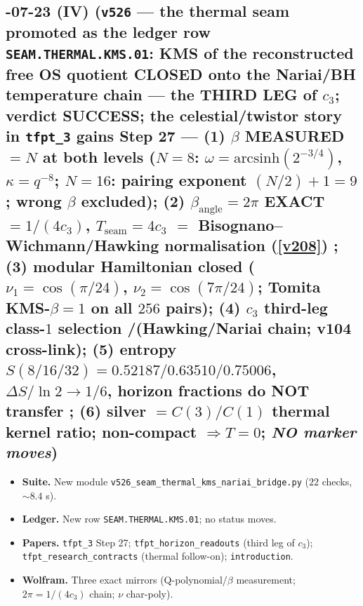 \subsection*{-07-23 (IV) (\texttt{v526} --- the thermal seam promoted as the ledger row \texttt{SEAM.THERMAL.KMS.01}: KMS of the reconstructed free OS quotient CLOSED onto the Nariai/BH temperature chain --- the THIRD LEG of $c_3$; verdict SUCCESS; the celestial/twistor story in \texttt{tfpt\_3} gains Step 27 --- (1) $\beta$ MEASURED $=N$ at both levels \mE ($N=8$: $\omega=\mathrm{arcsinh}(2^{-3/4})$, $\kappa=q^{-8}$; $N=16$: pairing exponent $(N/2)+1=9$; wrong $\beta$ excluded); (2) $\beta_{\mathrm{angle}}=2\pi$ EXACT $=1/(4c_3)$, $T_{\mathrm{seam}}=4c_3$ $=$ Bisognano--Wichmann/Hawking normalisation (\vref{v208}) \mE; (3) modular Hamiltonian closed \mE ($\nu_1=\cos(\pi/24)$, $\nu_2=\cos(7\pi/24)$; Tomita KMS-$\beta=1$ on all $256$ pairs); (4) $c_3$ third-leg class-$1$ selection \mE/\mC (Hawking/Nariai chain; v104 cross-link); (5) entropy $S(8/16/32)=0.52187/0.63510/0.75006$, $\Delta S/\ln2\to1/6$, horizon fractions do NOT transfer \mE; (6)  silver $=C(3)/C(1)$ thermal kernel ratio; non-compact $\Rightarrow T=0$; \emph{NO marker moves})}
\begin{itemize}[leftmargin=1.5em]
\item \textbf{Suite.} New module \texttt{v526\_seam\_thermal\_kms\_nariai\_bridge.py} ($22$ checks, $\sim8.4$ s).
\item \textbf{Ledger.} New row \texttt{SEAM.THERMAL.KMS.01}; no status moves.
\item \textbf{Papers.} \texttt{tfpt\_3} Step 27; \texttt{tfpt\_horizon\_readouts} (third leg of $c_3$);
\texttt{tfpt\_research\_contracts} (thermal follow-on); \texttt{introduction}.
\item \textbf{Wolfram.} Three exact mirrors (Q-polynomial/$\beta$ measurement; $2\pi=1/(4c_3)$ chain; $\nu$ char-poly).
\end{itemize}

